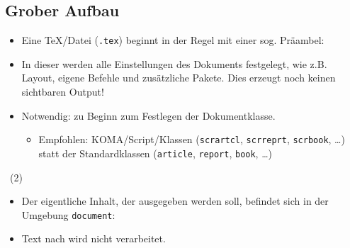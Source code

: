 \subsection{Grober Aufbau}

\begin{frame}[fragile]{\subsecname}
    \begin{itemize}
        \item Eine \TeX\-/Datei (\texttt{.tex}) beginnt in der Regel mit einer sog.
            \alert{Präambel}:
        \item In dieser werden alle Einstellungen des Dokuments festgelegt, wie z.B. Layout, eigene
            Befehle und zusätzliche Pakete. Dies erzeugt noch keinen sichtbaren Output!
        \item Notwendig:  zu Beginn zum Festlegen der
            \alert{Dokumentklasse}.
            \begin{itemize}
                \item Empfohlen: KOMA\-/Script\-/Klassen (\texttt{scrartcl}, \texttt{scrreprt},
                    \texttt{scrbook}, \dots) statt der Standardklassen (\texttt{article},
                    \texttt{report}, \texttt{book}, \dots)
            \end{itemize}
    \end{itemize}
\end{frame}

\begin{frame}[fragile]{\subsecname~(2)}
    \begin{itemize}
        \item Der eigentliche Inhalt, der ausgegeben werden soll, befindet sich in der Umgebung
            \texttt{document}:
        \item Text nach \code{} wird nicht verarbeitet.
    \end{itemize}
\end{frame}
